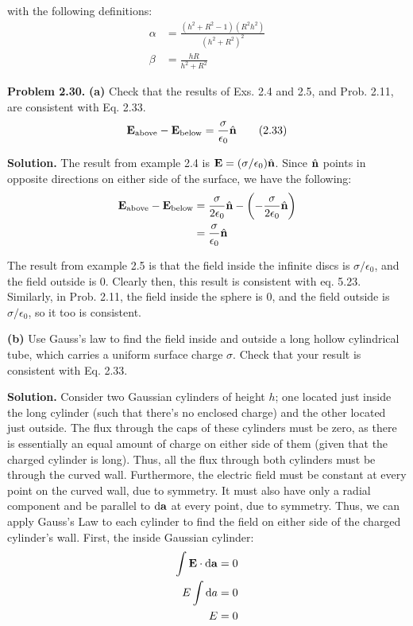 \documentclass{article}
\begin{document}
with the following definitions:
\begin{equation}
\begin{aligned}
\alpha &= \frac{(h^2+R^2-1)(R^2h^2)}{(h^2+R^2)^2} \\
\beta &= \frac{hR}{h^2+R^2}
\end{aligned}
\end{equation}

\hrulefill

\textbf{Problem 2.30.}
\textbf{(a)} Check that the results of Exs. 2.4 and 2.5, and Prob. 2.11, are consistent with Eq. 2.33.
\[
\vb{E}_\text{above} - \vb{E}_\text{below} = \frac{\sigma}{\epsilon_0}\hat{\vb{n}} \tag{2.33} \label{eq:2.33}
\]

\textbf{Solution.} The result from example 2.4 is $\vb{E} = (\sigma/\epsilon_0)\hat{\vb{n}}$. Since $\hat{\vb{n}}$ points in opposite directions on either side of the surface, we have the following:
\begin{equation*}
\begin{aligned}
\vb{E}_\text{above} - \vb{E}_\text{below} &= \frac{\sigma}{2\epsilon_0}\hat{\vb{n}} - \left(-\frac{\sigma}{2\epsilon_0}\hat{\vb{n}}\right) \\
&= \frac{\sigma}{\epsilon_0}\hat{\vb{n}}
\end{aligned}
\end{equation*}

The result from example 2.5 is that the field inside the infinite discs is $\sigma/\epsilon_0$, and the field outside is 0. Clearly then, this result is consistent with eq. 5.23. Similarly, in Prob. 2.11, the field inside the sphere is 0, and the field outside is $\sigma/\epsilon_0$, so it too is consistent.

\textbf{(b)} Use Gauss's law to find the field inside and outside a long hollow cylindrical tube, which carries a uniform surface charge $\sigma$. Check that your result is consistent with Eq. 2.33.

\textbf{Solution.} Consider two Gaussian cylinders of height $h$; one located just inside the long cylinder (such that there's no enclosed charge) and the other located just outside. The flux through the caps of these cylinders must be zero, as there is essentially an equal amount of charge on either side of them (given that the charged cylinder is long). Thus, all the flux through both cylinders must be through the curved wall. Furthermore, the electric field must be constant at every point on the curved wall, due to symmetry. It must also have only a radial component and be parallel to $\dd \vb{a}$ at every point, due to symmetry. Thus, we can apply Gauss's Law to each cylinder to find the field on either side of the charged cylinder's wall. First, the inside Gaussian cylinder:
\begin{equation*}
\begin{aligned}
\int \vb{E}\cdot \dd \vb{a} &= 0 \\
E\int\dd{a} &= 0 \\
E &= 0
\end{aligned}
\end{equation*}
\end{document}
